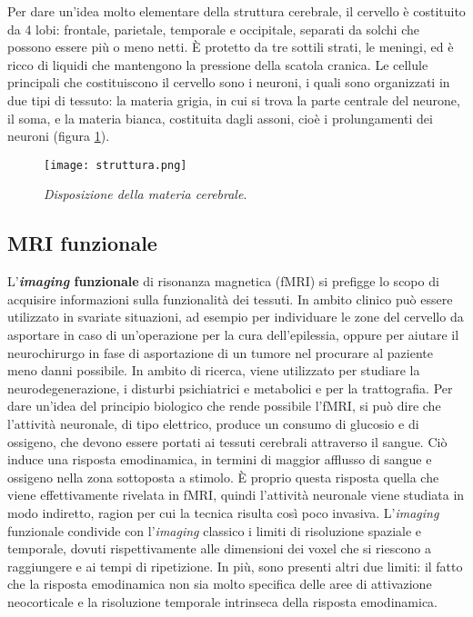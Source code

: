 \documentclass{report}
\newcommand{\figref}[1]{figura \ref{#1}}
\numberwithin{equation}{section}
\numberwithin{figure}{section}
\begin{document}
Per dare un'idea molto elementare della struttura cerebrale, il cervello è costituito da 4 lobi: frontale, parietale, temporale e occipitale, separati da solchi che possono essere più o meno netti. È protetto da tre sottili strati, le meningi, ed è ricco di liquidi che mantengono la pressione della scatola cranica. Le cellule principali che costituiscono il cervello sono i neuroni, i quali sono organizzati in due tipi di tessuto: la materia grigia, in cui si trova la parte centrale del neurone, il soma, e la materia bianca, costituita dagli assoni, cioè i prolungamenti dei neuroni (\figref{fig:struttura}).

\begin{figure}[htp]
\centering
\texttt{[image: struttura.png]}
\caption{\label{fig:struttura} \textit{Disposizione della materia cerebrale}.}
\end{figure}

\subsection{MRI funzionale}
L'\textbf{\textit{imaging} funzionale} di risonanza magnetica (fMRI) si prefigge lo scopo di acquisire informazioni sulla funzionalità dei tessuti. In ambito clinico può essere utilizzato in svariate situazioni, ad esempio per individuare le zone del cervello da asportare in caso di un'operazione per la cura dell'epilessia, oppure per aiutare il neurochirurgo in fase di asportazione di un tumore nel procurare al paziente meno danni possibile. In ambito di ricerca, viene utilizzato per studiare la neurodegenerazione, i disturbi psichiatrici e metabolici e per la trattografia. Per dare un'idea del principio biologico che rende possibile l'fMRI, si può dire che l'attività neuronale, di tipo elettrico, produce un consumo di glucosio e di ossigeno, che devono essere portati ai tessuti cerebrali attraverso il sangue. Ciò induce una risposta emodinamica, in termini di maggior afflusso di sangue e ossigeno nella zona sottoposta a stimolo. È proprio questa risposta quella che viene effettivamente rivelata in fMRI, quindi l'attività neuronale viene studiata in modo indiretto, ragion per cui la tecnica risulta così poco invasiva. L'\textit{imaging} funzionale condivide con l'\textit{imaging} classico i limiti di risoluzione spaziale e temporale, dovuti rispettivamente alle dimensioni dei voxel che si riescono a raggiungere e ai tempi di ripetizione. In più, sono presenti altri due limiti: il fatto che la risposta emodinamica non sia molto specifica delle aree di attivazione neocorticale e la risoluzione temporale intrinseca della risposta emodinamica.
\end{document}
